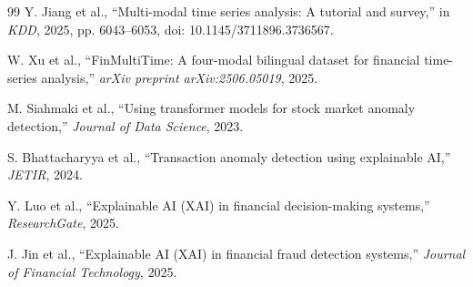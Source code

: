 \documentclass[11pt,a4paper,twoside]{article}
\begin{document}
\begin{thebibliography}{99}
Y. Jiang et al.,
``Multi-modal time series analysis: A tutorial and survey,''
in \emph{KDD}, 2025, pp. 6043--6053, doi: 10.1145/3711896.3736567.

W. Xu et al.,
``FinMultiTime: A four-modal bilingual dataset for financial time-series analysis,''
\emph{arXiv preprint arXiv:2506.05019}, 2025.

M. Siahmaki et al.,
``Using transformer models for stock market anomaly detection,''
\emph{Journal of Data Science}, 2023.

S. Bhattacharyya et al.,
``Transaction anomaly detection using explainable AI,''
\emph{JETIR}, 2024.

Y. Luo et al.,
``Explainable AI (XAI) in financial decision-making systems,''
\emph{ResearchGate}, 2025.

J. Jin et al.,
``Explainable AI (XAI) in financial fraud detection systems,''
\emph{Journal of Financial Technology}, 2025.

\end{thebibliography}
\endgroup
\end{document}
